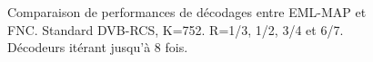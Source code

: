 
\begin{figure}[!t]
\centering
		
	\caption{Comparaison de performances de décodages entre EML-MAP et FNC. Standard DVB-RCS, K=752. R=1/3, 1/2, 3/4 et 6/7.
	Décodeurs itérant jusqu'à 8 fois. \label{fig:fnc_dvb_752}}
\end{figure}